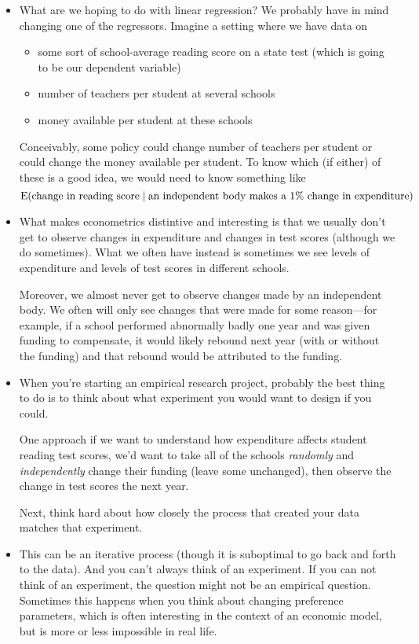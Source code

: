 \begin{itemize}[leftmargin=0pt]

\item What are we hoping to do with linear regression?  We probably
  have in mind changing one of the regressors.  Imagine a setting
  where we have data on
  \begin{itemize}
  \item some sort of school-average reading score on a state test
    (which is going to be our dependent variable)
  \item number of teachers per student at several schools
  \item money available per student at these schools
  \end{itemize}
  Conceivably, some policy could change number of teachers per student
  or could change the money available per student.  To know which (if
  either) of these is a good idea, we would need to know something like
  \begin{equation*}
    \operatorname{E}(\text{change in reading score} \mid
       \text{an independent body makes a 1\% change in expenditure})
  \end{equation*}

\item What makes econometrics distintive and interesting is that we
  usually don't get to observe changes in expenditure and changes in
  test scores (although we do sometimes).  What we often have instead
  is sometimes we see levels of expenditure and levels of test scores
  in different schools.

  Moreover, we almost never get to observe changes made by an
  independent body.  We often will only see changes that were made for
  some reason---for example, if a school performed abnormally badly one
  year and was given funding to compensate, it would likely rebound
  next year (with or without the funding) and that rebound would be
  attributed to the funding.

\item When you're starting an empirical research project, probably the
  best thing to do is to think about what experiment you would want to
  design if you could.

  One approach if we want to understand how expenditure affects
  student reading test scores, we'd want to take all of the schools
  \emph{randomly} and \emph{independently} change their funding (leave
  some unchanged), then observe the change in test scores the next
  year.

  Next, think hard about how closely the process that created your
  data matches that experiment.

\item This can be an iterative process (though it is suboptimal to go
  back and forth to the data).  And you can't always think of an
  experiment.  If you can not think of an experiment, the question
  might not be an empirical question.  Sometimes this happens when you
  think about changing preference parameters, which is often
  interesting in the context of an economic model, but is more or less
  impossible in real life.

\end{itemize}

